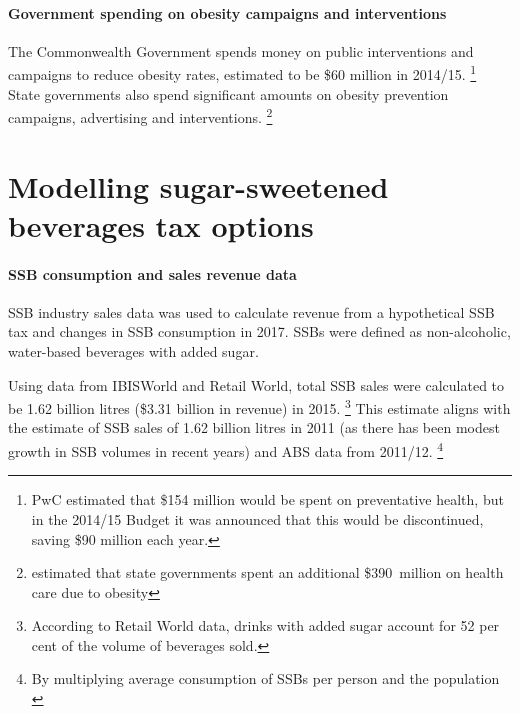 \documentclass[embargoed]{grattan}
\begin{document}
\subsubsection{Government spending on obesity campaigns and interventions}\label{government-spending-on-obesity-campaigns-and-interventions}

The Commonwealth Government spends money on public interventions and campaigns to reduce obesity rates, estimated to be \$60 million in 2014/15.%
\footnote{PwC estimated that \$154 million would be spent on preventative health, but in the 2014/15 Budget it was announced that this would be discontinued, saving \$90 million each year\textcites{PwC2015Weighingcostobesity}{Treasury2016201617BudgetBudget}.} State governments also spend significant amounts on obesity prevention campaigns, advertising and interventions.%
\footnote{\textcite{PwC2015Weighingcostobesity} estimated that state governments spent an additional \$390~million on health care due to obesity}

\chapter{Modelling sugar-sweetened beverages tax options}\label{appendix-3-modelling-sugar-sweetened-beverages-tax-options}

\subsubsection{SSB consumption and sales revenue data}\label{ssb-consumption-and-sales-revenue-data}

SSB industry sales data was used to calculate revenue from a hypothetical SSB tax and changes in SSB consumption in 2017.
SSBs were defined as non-alcoholic, water-based beverages with added sugar.

Using data from IBISWorld and Retail World, total SSB sales were calculated to be 1.62 billion litres (\$3.31 billion in revenue) in 2015.%
\footnote{\textcites{Media2015RetailWorldAnnual}{IBISWorld2016FruitJuiceDrink}{IBISWorld2016SoftDrinkManufacturing}
According to Retail World data, drinks with added sugar account for 52 per cent of the volume of beverages sold.} This estimate aligns with the \textcite{Levy2014QuenchingAustraliasthirst} estimate of SSB sales of 1.62 billion litres in 2011 (as there has been modest growth in SSB volumes in recent years) and ABS data from 2011/12.%
\footnote{By multiplying average consumption of SSBs per person and the population \textcite{ABS20144364055007AustralianHealth}}
\end{document}
